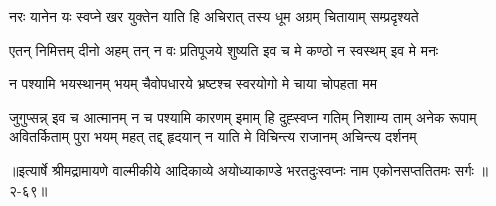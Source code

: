 \twolineshloka
{नरः यानेन यः स्वप्ने खर युक्तेन याति हि}
{अचिरात् तस्य धूम अग्रम् चितायाम् सम्प्रदृश्यते} %

\twolineshloka
{एतन् निमित्तम् दीनो अहम् तन् न वः प्रतिपूजये}
{शुष्यति इव च मे कण्ठो न स्वस्थम् इव मे मनः} %

\twolineshloka
{न पश्यामि भयस्थानम् भयम् चैवोपधारये}
{भ्रष्टश्च स्वरयोगो मे चाया चोपहता मम} %

\twolineshloka
{जुगुप्सन्न् इव च आत्मानम् न च पश्यामि कारणम्}
{इमाम् हि दुह्स्वप्न गतिम् निशाम्य ताम्}
{अनेक रूपाम् अवितर्किताम् पुरा}
{भयम् महत् तद्द् हृदयान् न याति मे}
{विचिन्त्य राजानम् अचिन्त्य दर्शनम्} %


॥इत्यार्षे श्रीमद्रामायणे वाल्मीकीये आदिकाव्ये अयोध्याकाण्डे भरतदुःस्वप्नः नाम एकोनसप्ततितमः सर्गः ॥२-६९॥
